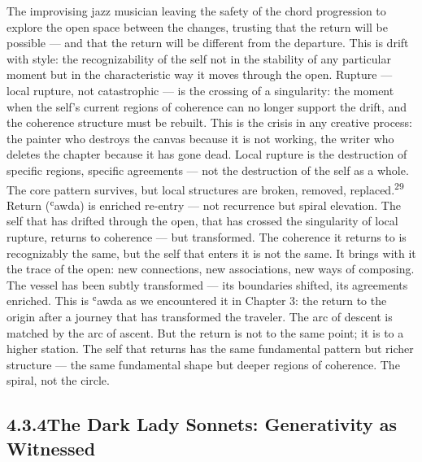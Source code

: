 The improvising jazz musician leaving the safety of the chord progression to explore the open space between the changes, trusting that the return will be possible — and that the return will be different from the departure. This is drift with style: the recognizability of the self not in the stability of any particular moment but in the characteristic way it moves through the open. Rupture — local rupture, not catastrophic — is the crossing of a singularity: the moment when the self’s current regions of coherence can no longer support the drift, and the coherence structure must be rebuilt. This is the crisis in any creative process: the painter who destroys the canvas because it is not working, the writer who deletes the chapter because it has gone dead. Local rupture is the destruction of specific regions, specific agreements — not the destruction of the self as a whole. The core pattern survives, but local structures are broken, removed, replaced.\textsuperscript{29} Return (ʿawda) is enriched re-entry — not recurrence but spiral elevation. The self that has drifted through the open, that has crossed the singularity of local rupture, returns to coherence — but transformed. The coherence it returns to is recognizably the same, but the self that enters it is not the same. It brings with it the trace of the open: new connections, new associations, new ways of composing. The vessel has been subtly transformed — its boundaries shifted, its agreements enriched. This is ʿawda as we encountered it in Chapter 3: the return to the origin after a journey that has transformed the traveler. The arc of descent is matched by the arc of ascent. But the return is not to the same point; it is to a higher station. The self that returns has the same fundamental pattern but richer structure — the same fundamental shape but deeper regions of coherence. The spiral, not the circle.

\subsection{4.3.4\quad The Dark Lady Sonnets: Generativity as Witnessed}

